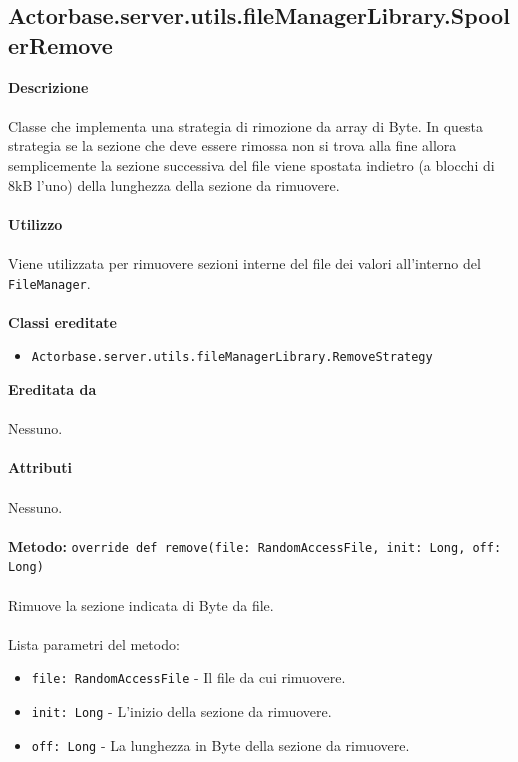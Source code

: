 \documentclass[a4paper]{article}
\begin{document}
	\subsection{Actorbase.server.utils.fileManagerLibrary.SpoolerRemove}
		\textbf{Descrizione}
		\\ \\
		Classe che implementa una strategia di rimozione da array di Byte. In questa strategia se la sezione che deve essere rimossa non si trova alla fine allora semplicemente la sezione successiva del file viene spostata indietro (a blocchi di 8kB l'uno) della lunghezza della sezione da rimuovere.
		\\ \\
		\textbf{Utilizzo}
		\\ \\
		Viene utilizzata per rimuovere sezioni interne del file dei valori all'interno del \texttt{FileManager}.
		\\ \\
		\textbf{Classi ereditate}
		\begin{itemize}
		 \item \texttt{Actorbase.server.utils.fileManagerLibrary.RemoveStrategy}
		\end{itemize}
		\textbf{Ereditata da}
		\\ \\
		Nessuno.
		\\ \\
		\textbf{Attributi}
		\\ \\
		Nessuno.
		\\ \\
		\textbf{Metodo:} \texttt{override def remove(file: RandomAccessFile, init: Long, off: Long)}
		\\ \\
		Rimuove la sezione indicata di Byte da file.
		\\ \\
		Lista parametri del metodo:
		\begin{itemize}
			\item \texttt{file: RandomAccessFile} - Il file da cui rimuovere.
			\item \texttt{init: Long} - L'inizio della sezione da rimuovere.
			\item \texttt{off: Long} - La lunghezza in Byte della sezione da rimuovere.
		\end{itemize}
			
\end{document}
